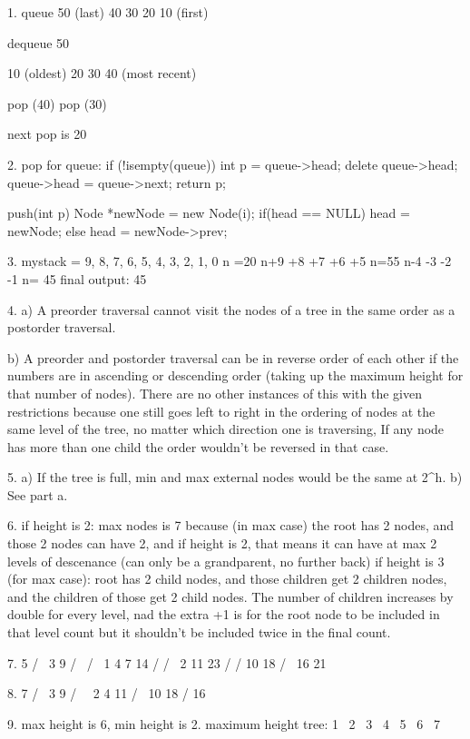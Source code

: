 1. queue
50 (last)
40
30
20
10 (first)

dequeue
50 

10 (oldest)
20
30
40 (most recent)

pop (40)
pop (30)

next pop is 20

2. pop for queue:
	if (!isempty(queue)){
		int p = queue->head;
		delete queue->head;
		queue->head  = queue->next;
		return p;
	}

push(int p){
	Node *newNode = new Node(i);
	if(head == NULL){
		head = newNode;
	}else{
		head = newNode->prev;
	}
}

3. mystack = {9, 8, 7, 6, 5, 4, 3, 2, 1, 0}
n =20
n+9 +8 +7 +6 +5
n=55
n-4 -3 -2 -1
n= 45
final output: 45

4.
	a) A preorder traversal cannot visit the nodes of a tree in the same order as a postorder traversal.

	b) A preorder and postorder traversal can be in reverse order of each other if the numbers are in ascending or descending order (taking up the maximum height for that number of nodes). There are no other instances of this with the given restrictions because one still goes left to right in the ordering of nodes at the same level of the tree, no matter which direction one is traversing, If any node has more than one child the order wouldn't be reversed in that case.

5. 
	a) If the tree is full, min and max external nodes would be the same at 2^h.
	b) See part a.

6. if height is 2:
	max nodes is 7 because (in max case) the root has 2 nodes, and those 2 nodes can have 2, and if height is 2, that means it can have at max 2 levels of descenance (can only be a grandparent, no further back)
	if height is 3 (for max case):
	root has 2 child nodes, and those children get 2 children nodes, and the children of those get 2 child nodes. The number of children increases by double for every level, nad the extra +1 is for the root node to be included in that level count but it shouldn't be included twice in the final count.

7.   5
    /  \
   3    9
  / \   / \
 1   4 7  14
    /    /  \
    2   11   23
        /    /
       10   18
            / \
           16  21

8.    7
     /  \
    3    9
   / \    \
  2   4   11
         /  \
        10   18
             /
            16

9. max height is 6, min height is 2.
	maximum height tree:
	 1
	  \
	   2
	    \
	     3
	      \
	       4
	        \
	         5
	          \
	           6
	            \
	             7

